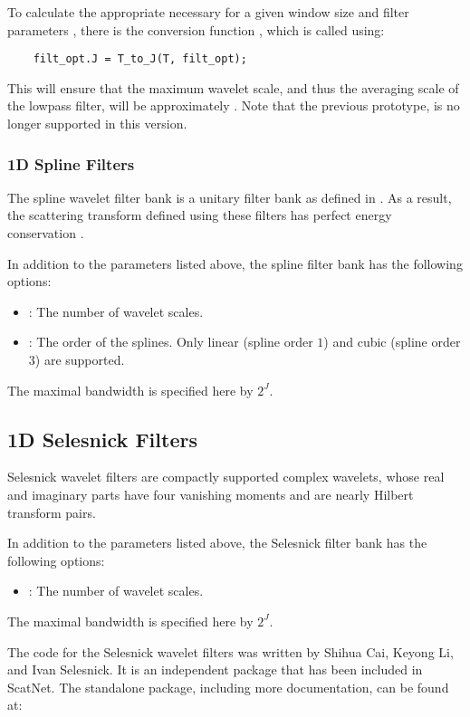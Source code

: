 \documentclass{article}
\begin{document}
To calculate the appropriate  necessary for a given window size  and filter parameters , there is the conversion function , which is called using:
\begin{lstlisting}
	filt_opt.J = T_to_J(T, filt_opt);
\end{lstlisting}
This will ensure that the maximum wavelet scale, and thus the averaging scale of the lowpass filter, will be approximately . Note that the previous prototype,  is no longer supported in this version.

\subsubsection{1D Spline Filters}
The spline wavelet filter bank is a unitary filter bank as defined in \cite{mallatbook}. As a result, the scattering transform defined using these filters has perfect energy conservation \cite{stephane}.

In addition to the parameters listed above, the spline filter bank has the following options:
\begin{itemize}
	\item {}: The number of wavelet scales.
	\item {}: The order of the splines. Only linear (spline order $1$) and cubic (spline order $3$) are supported.
\end{itemize}
The maximal bandwidth is specified here by $2^J$.

\subsection{1D Selesnick Filters}
Selesnick wavelet filters are compactly supported complex wavelets, whose real and imaginary parts have four vanishing moments and are nearly Hilbert transform pairs.

In addition to the parameters listed above, the Selesnick filter bank has the following options:
\begin{itemize}
  \item {}: The number of wavelet scales.
\end{itemize}
The maximal bandwidth is specified here by $2^J$.

The code for the Selesnick wavelet filters was written by Shihua Cai, Keyong Li, and Ivan Selesnick. It is an independent package that has been included in ScatNet. The standalone package, including more documentation, can be found at:
\end{document}

